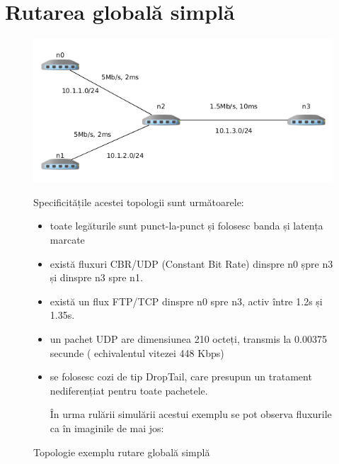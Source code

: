 \documentclass[12pt, a4paper, oneside, romanian]{teza-upb}
\begin{document}
\section{Rutarea globală simplă}
\begin{figure}[H]
\centering
\includegraphics*[scale=0.65]{img/simple_global_routing_topo.png}
\caption{Topologie exemplu rutare globală simplă}

Specificitățile acestei topologii sunt următoarele:
\begin{itemize}
\item toate legăturile sunt punct-la-punct și folosesc banda și latența marcate
\item există fluxuri CBR/UDP (Constant Bit Rate) dinspre n0 șpre n3 și dinspre n3 spre n1.
\item există un flux FTP/TCP dinspre n0 spre n3, activ între 1.2s și 1.35s.
\item un pachet UDP are dimensiunea 210 octeți, transmis la 0.00375 secunde ( echivalentul vitezei 448 Kbps)
\item se folosesc cozi de tip DropTail, care presupun un tratament nediferențiat pentru toate pachetele. 

În urma rulării simulării acestui exemplu se pot observa fluxurile ca în imaginile de mai jos: 

\end{itemize}
\end{figure} 
\end{document}
